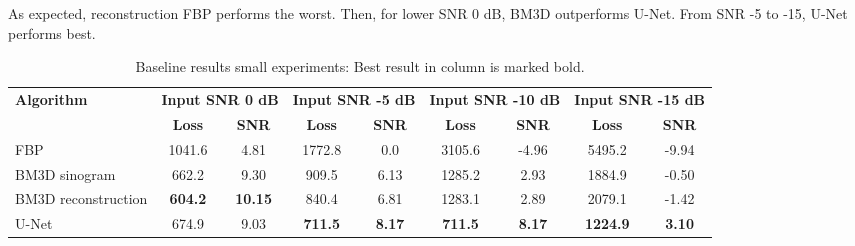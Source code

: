 As expected, reconstruction FBP performs the worst. Then, for lower SNR 0 dB, BM3D outperforms U-Net.
From SNR -5 to -15, U-Net performs best.

\begin{table}[H]
  \centering
  \begin{threeparttable}
    \begin{tabular}{l|cc|cc|cc|cc}
    \toprule
    \textbf{Algorithm} & \multicolumn{2}{l|}{\footnotesize \textbf{Input SNR 0 dB}} & \multicolumn{2}{l|}{\footnotesize \textbf{Input SNR -5 dB}} & \multicolumn{2}{l|}{\footnotesize \textbf{Input SNR -10 dB}} & \multicolumn{2}{l}{\footnotesize \textbf{Input SNR -15 dB}} \\
                       & \textbf{Loss} & \textbf{SNR} & \textbf{Loss} & \textbf{SNR} & \textbf{Loss} & \textbf{SNR} & \textbf{Loss} & \textbf{SNR} \\ 
    \midrule
    FBP                 &  1041.6          &  4.81            & 1772.8         & 0.0           & 3105.6          & -4.96          & 5495.2       & -9.94       \\ \hline
    BM3D sinogram       &  662.2           &  9.30            & 909.5          & 6.13          & 1285.2          & 2.93           & 1884.9       & -0.50       \\ \hline
    BM3D reconstruction &  \textbf{604.2}  &  \textbf{10.15}  & 840.4          & 6.81          & 1283.1          & 2.89           & 2079.1       & -1.42       \\ \hline
    U-Net               &  674.9           &  9.03            & \textbf{711.5} & \textbf{8.17} & \textbf{711.5}  & \textbf{8.17}  & \textbf{1224.9}       & \textbf{3.10}        \\ 
    \midrule
    \end{tabular}

  \end{threeparttable}

  \caption{Baseline results small experiments: Best result in column is marked bold. }
  \label{tab:baseline-small}
\end{table}

